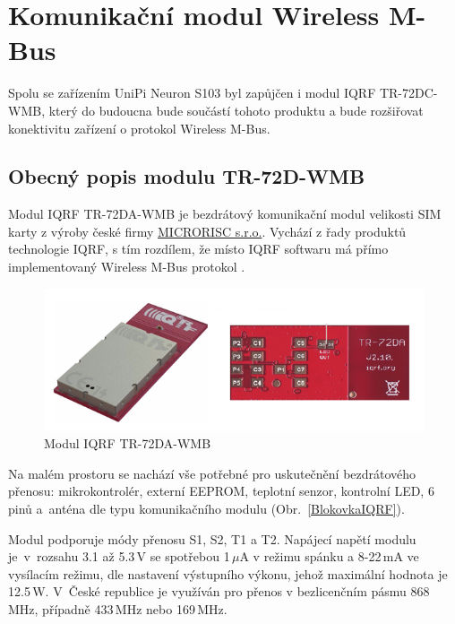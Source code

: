 \chapter{Komunikační modul Wireless M-Bus}

Spolu se zařízením UniPi Neuron S103 byl zapůjčen i modul IQRF TR-72DC-WMB, který do budoucna bude součástí tohoto produktu a bude rozšiřovat konektivitu zařízení o protokol Wireless M-Bus. 

\section{Obecný popis modulu TR-72D-WMB}

Modul IQRF TR-72DA-WMB je bezdrátový komunikační modul velikosti SIM karty z výroby české firmy \href{http://microrisc.com/cs/}{MICRORISC s.r.o.}. Vychází z řady produktů technologie IQRF, s tím rozdílem, že místo IQRF softwaru má přímo implementovaný Wireless M-Bus protokol \cite{ModulIQRF}. 

 \begin{figure}[!ht]
\vspace{-1,pt}
  \begin{center}
    \includegraphics[scale=0.76]{obrazky/modul_modul}
  \end{center}
	\vspace{-20pt}
  \caption{Modul IQRF TR-72DA-WMB \cite{ModulIQRF}}
	\vspace{-10pt}
\end{figure}

Na malém prostoru se nachází vše potřebné pro uskutečnění bezdrátového přenosu: mikrokontrolér, externí EEPROM, teplotní senzor, kontrolní LED, 6 pinů a~anténa dle typu komunikačního modulu (Obr.~\ref{BlokovkaIQRF}).



Modul podporuje módy přenosu S1, S2, T1 a T2. Napájecí napětí modulu je~v~rozsahu 3.1 až 5.3\,V se spotřebou 1\,$\mu$A v režimu spánku a 8-22\,mA ve vysílacím režimu, dle nastavení výstupního výkonu, jehož maximální hodnota je 12.5\,W.
V~České republice je využíván pro přenos v bezlicenčním pásmu 868\,MHz, případně 433\,MHz nebo 169\,MHz.\newline

